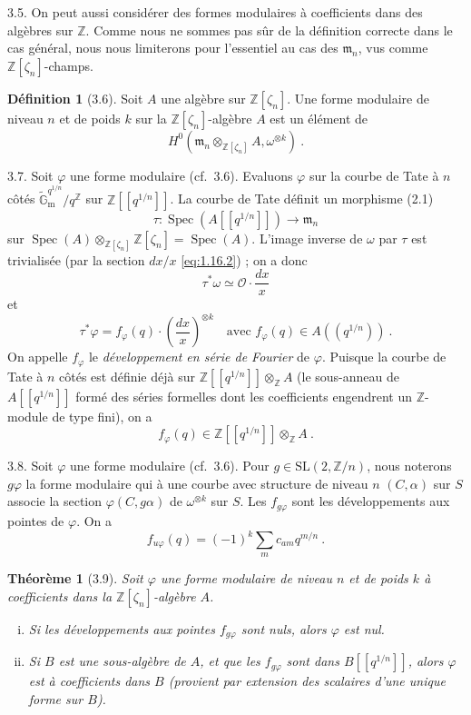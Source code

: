 \documentclass[12pt,a4paper]{amsart}
\theoremstyle{plain}
\newtheorem{theoreme}[proposition]{Th\'eor\`eme}
\theoremstyle{definition}
\newtheorem{definition}[proposition]{D\'efinition}
\theoremstyle{remark}
\DeclareMathOperator{\Spec}{Spec}
\newcommand{\ZZ}{\mathbb{Z}}
\newcommand{\Gmtilde}{\widetilde{\mathbb{G}}_\mathrm{m}}
\begin{document}
\medskip

3.5. On peut aussi consid\'erer des formes modulaires \`a coefficients dans des alg\`ebres sur $\ZZ$. Comme nous ne sommes pas s\^ur de la d\'efinition correcte dans le cas g\'en\'eral, nous nous limiterons pour l'essentiel au cas des $\mathfrak{m}_n$, vus comme $\ZZ[\zeta_n]$-champs.

\begin{definition}[3.6]
Soit $A$ une alg\`ebre sur $\ZZ[\zeta_n]$. Une forme modulaire de niveau $n$ et de poids $k$ sur la $\ZZ[\zeta_n]$-alg\`ebre $A$ est un \'el\'ement de
\[
H^0(\mathfrak{m}_n \otimes_{\ZZ[\zeta_n]} A, \omega^{\otimes k}) \ .
\]
\end{definition}

3.7. Soit $\varphi$ une forme modulaire (cf.~3.6). Evaluons $\varphi$ sur la courbe de Tate \`a $n$ c\^ot\'es $\Gmtilde^{q^{1/n}} / q^{\ZZ}$ sur $\ZZ[[q^{1/n}]]$. La courbe de Tate d\'efinit un morphisme (2.1)
\[
\tau : \Spec(A[[q^{1/n}]]) \longrightarrow \mathfrak{m}_n
\]
sur $\Spec(A) \otimes_{\ZZ[\zeta_n]} \ZZ[\zeta_n] = \Spec(A)$. L'image inverse de $\omega$ par $\tau$ est trivialis\'ee (par la section $dx/x$ \eqref{eq:1.16.2}) ; on a donc
\[
\tau^* \omega \simeq \mathcal{O} \cdot \frac{dx}{x}
\]
et
\[
\tau^* \varphi = f_\varphi(q) \cdot \left(\frac{dx}{x}\right)^{\otimes k} \quad \text{avec } f_\varphi(q) \in A((q^{1/n})) \ .
\]
On appelle $f_\varphi$ le \emph{d\'eveloppement en s\'erie de Fourier} de $\varphi$. Puisque la courbe de Tate \`a $n$ c\^ot\'es est d\'efinie d\'ej\`a sur $\ZZ[[q^{1/n}]] \otimes_{\ZZ} A$ (le sous-anneau de $A[[q^{1/n}]]$ form\'e des s\'eries formelles dont les coefficients engendrent un $\ZZ$-module de type fini), on a
\begin{equation}\label{eq:3.7.0}
f_\varphi(q) \in \ZZ[[q^{1/n}]] \otimes_{\ZZ} A \ .
\end{equation}

3.8. Soit $\varphi$ une forme modulaire (cf.~3.6). Pour $g \in \mathrm{SL}(2, \ZZ/n)$, nous noterons $g\varphi$ la forme modulaire qui \`a une courbe avec structure de niveau $n$ $(C, \alpha)$ sur $S$ associe la section $\varphi(C, g\alpha)$ de $\omega^{\otimes k}$ sur $S$. Les $f_{g\varphi}$ sont les d\'eveloppements aux pointes de $\varphi$. On a
\begin{equation}\label{eq:3.8.0}
f_{u\varphi}(q) = (-1)^k \sum_{m} c_{a m} q^{m/n} \ .
\end{equation}

\begin{theoreme}[3.9]
Soit $\varphi$ une forme modulaire de niveau $n$ et de poids $k$ \`a coefficients dans la $\ZZ[\zeta_n]$-alg\`ebre $A$.
\begin{enumerate}[(i)]
\item Si les d\'eveloppements aux pointes $f_{g\varphi}$ sont nuls, alors $\varphi$ est nul.

\item Si $B$ est une sous-alg\`ebre de $A$, et que les $f_{g\varphi}$ sont dans $B[[q^{1/n}]]$, alors $\varphi$ est \`a coefficients dans $B$ (provient par extension des scalaires d'une unique forme sur $B$).
\end{enumerate}
\end{theoreme}
\end{document}
